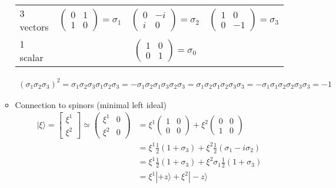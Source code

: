 \documentclass[../main.tex]{subfiles}
\begin{document}
\begin{itemize}
\begin{itemize}
\begin{center}
\begin{table}[!h]
\begin{tcolorbox}
\begin{tabular}{lccc}
3 vectors 
&
$\left(\begin{matrix}
0 & 1\\
1 & 0
\end{matrix}
\right)=\sigma_1$&$
\left(\begin{matrix}
0 & -i\\
i & 0
\end{matrix}
\right)=\sigma_2$&$
\left(\begin{matrix}
1 & 0\\
0 & -1
\end{matrix}
\right)=\sigma_3$\\
1 scalar &&$\left(\begin{matrix}
1 & 0\\
0 & 1
\end{matrix}
\right)=\sigma_0$&
\end{tabular}
\end{tcolorbox}
\end{table}
\end{center}
\begin{align}
(\sigma_1\sigma_2\sigma_3)^2
=\sigma_1\sigma_2\sigma_3\sigma_1\sigma_2\sigma_3
=-\sigma_1\sigma_2\sigma_1\sigma_3\sigma_2\sigma_3
=\sigma_1\sigma_2\sigma_1\sigma_2\sigma_3\sigma_3
=-\sigma_1\sigma_1\sigma_2\sigma_2\sigma_3\sigma_3
=-1
\end{align}
\item Connection to spinors (minimal left ideal)
\begin{align}
|\xi\rangle=\left[\begin{matrix}
\xi^1 \\
\xi^2 
\end{matrix}
\right]\simeq\left(\begin{matrix}
\xi^1 & 0 \\
\xi^2 & 0 
\end{matrix}
\right)
&=\xi^1\left(\begin{matrix}
1 & 0 \\
0 & 0 
\end{matrix}
\right)+\xi^2\left(\begin{matrix}
0 & 0 \\
1 & 0 
\end{matrix}
\right)\\
&=\xi^1\frac{1}{2}(1+\sigma_3)+\xi^2\frac{1}{2}(\sigma_1-i\sigma_2)\\
&=\xi^1\frac{1}{2}(1+\sigma_3)+\xi^2\sigma_1\frac{1}{2}(1+\sigma_3)\\
&=\xi^1|+z\rangle+\xi^2|-z\rangle
\end{align}

\end{itemize}
\end{itemize}
\end{document}
